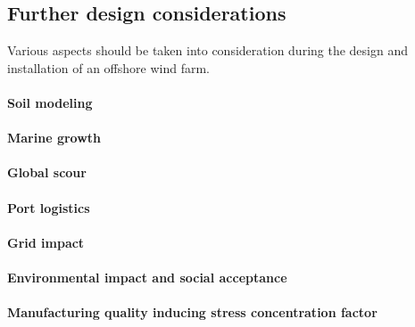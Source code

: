 \subsection{Further design considerations}
Various aspects should be taken into consideration during the design and installation of an offshore wind farm.


\paragraph{Soil modeling}

\paragraph{Marine growth}

\paragraph{Global scour}

\paragraph{Port logistics}

\paragraph{Grid impact}

\paragraph{Environmental impact and social acceptance} 

\paragraph{Manufacturing quality inducing stress concentration factor}



